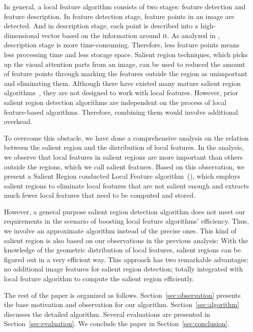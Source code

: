 In general, a local feature algorithm consists of two stages: feature detection and feature description. In feature detection stage, feature points in an image are detected. And in description stage, each point is described into a high-dimensional vector based on the information around it. As analyzed in \cite{adaptivepipelineicpp2012}, description stage is more time-consuming. Therefore, less feature points means less processing time and less storage space. Salient region techniques, which picks up the visual attention parts from an image, can be used to reduced the amount of feature points through marking the features outside the region as unimportant and eliminating them. Although there have existed many mature salient region algorithms~\cite{cheng2011global,achanta2009frequency,itti1998model}, they are not designed to work with local features. However, prior salient region detection algorithms are independent on the process of local feature-based algorithms. Therefore,  combining them would involve additional overhead.

To overcome this obstacle, we have done a comprehensive analysis on the relation between the salient region and the distribution of local features. In the analysis, we observe that local features in salient regions are more important than others outside the regions, which we call salient features. Based on this observation, we present a Salient Region conducted Local Feature algorithm~({\sys}), which employs salient regions to eliminate local features that are not salient enough and extracts much fewer local features that need to be computed and stored. 

However, a general purpose salient region detection algorithm does not meet our requirements in the scenario of boosting local feature algorithms' efficiency. Thus, we involve an approximate algorithm instead of the precise ones. This kind of salient region is also based on our observations in the previous analysis: With the knowledge of the geometric distribution of local features, salient regions can be figured out in a very efficient way. This approach has two remarkable advantages: no additional image features for salient region detection; totally integrated with local feature algorithm to compute the salient region efficiently. 

The rest of the paper is organized as follows. Section~\ref{sec:observation} presents the base motivation and observation for our algorithm. Section~\ref{sec:algorithm} discusses the detailed algorithm. Several evaluations are presented in Section~\ref{sec:evaluation}. We conclude the paper in Section~\ref{sec:conclusion}.